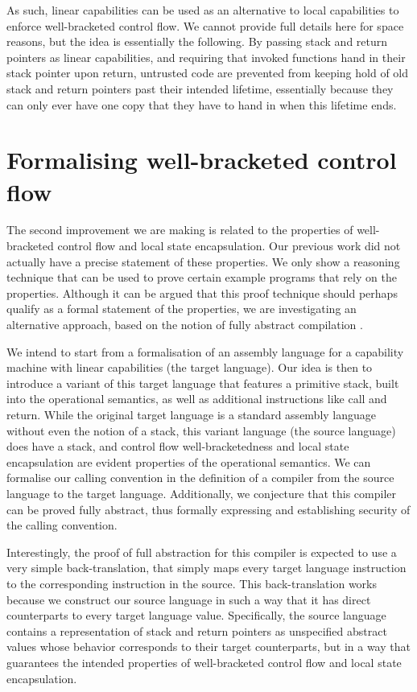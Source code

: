 \documentclass[sigplan, review]{acmart}
\begin{document}
As such, linear capabilities can be used as an alternative to local capabilities to enforce well-bracketed control flow.
We cannot provide full details here for space reasons, but the idea is essentially the following.
By passing stack and return pointers as linear capabilities, and requiring that invoked functions hand in their stack pointer upon return, untrusted code are prevented from keeping hold of old stack and return pointers past their intended lifetime, essentially because they can only ever have one copy that they have to hand in when this lifetime ends.

\section{Formalising well-bracketed control flow}
The second improvement we are making is related to the properties of well-bracketed control flow and local state encapsulation.
Our previous work did not actually have a precise statement of these properties.
We only show a reasoning technique that can be used to prove certain example programs that rely on the properties.
Although it can be argued that this proof technique should perhaps qualify as a formal statement of the properties, we are investigating an alternative approach, based on the notion of fully abstract compilation \citep{abadi_protection_1999}.

We intend to start from a formalisation of an assembly language for a capability machine with linear capabilities (the target language).
Our idea is then to introduce a variant of this target language that features a primitive stack, built into the operational semantics, as well as additional instructions like call and return.
While the original target language is a standard assembly language without even the notion of a stack, this variant language (the source language) does have a stack, and control flow well-bracketedness and local state encapsulation are evident properties of the operational semantics.
We can formalise our calling convention in the definition of a compiler from the source language to the target language.
Additionally, we conjecture that this compiler can be proved fully abstract, thus formally expressing and establishing security of the calling convention.

Interestingly, the proof of full abstraction for this compiler is expected to use a very simple back-translation, that simply maps every target language instruction to the corresponding instruction in the source.
This back-translation works because we construct our source language in such a way that it has direct counterparts to every target language value.
Specifically, the source language contains a representation of stack and return pointers as unspecified abstract values whose behavior corresponds to their target counterparts, but in a way that guarantees the intended properties of well-bracketed control flow and local state encapsulation.


 
\end{document}
